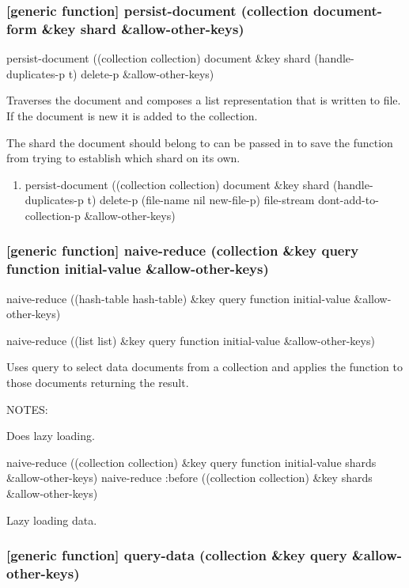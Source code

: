 \documentclass[11pt]{article}
\begin{document}
\subsubsection{[generic function] persist-document (collection document-form \&key shard \&allow-other-keys)}
\label{sec:org8466fd8}

persist-document ((collection collection) document \&key shard (handle-duplicates-p t) delete-p \&allow-other-keys)

Traverses the document and composes a list representation that is
written to file. If the document is new it is added to the collection.

The shard the document should belong to can be passed in to save the
function from trying to establish which shard on its own.

\begin{enumerate}
\item persist-document ((collection collection) document \&key shard (handle-duplicates-p t) delete-p (file-name nil new-file-p) file-stream dont-add-to-collection-p \&allow-other-keys)
\label{sec:orgef7da2a}
\end{enumerate}

\subsubsection{[generic function] naive-reduce (collection \&key query function initial-value \&allow-other-keys)}
\label{sec:orgfdc2789}

naive-reduce ((hash-table hash-table) \&key query function initial-value  \&allow-other-keys)

naive-reduce ((list list) \&key query function initial-value  \&allow-other-keys)

Uses query to select data documents from a collection and applies the
function to those documents returning the result.

NOTES:

Does lazy loading.

naive-reduce ((collection collection) \&key query function initial-value shards \&allow-other-keys)
naive-reduce :before ((collection collection) \&key shards \&allow-other-keys)

Lazy loading data.

\subsubsection{[generic function] query-data (collection \&key query \&allow-other-keys)}
\label{sec:org14e1c1a}
\end{document}
